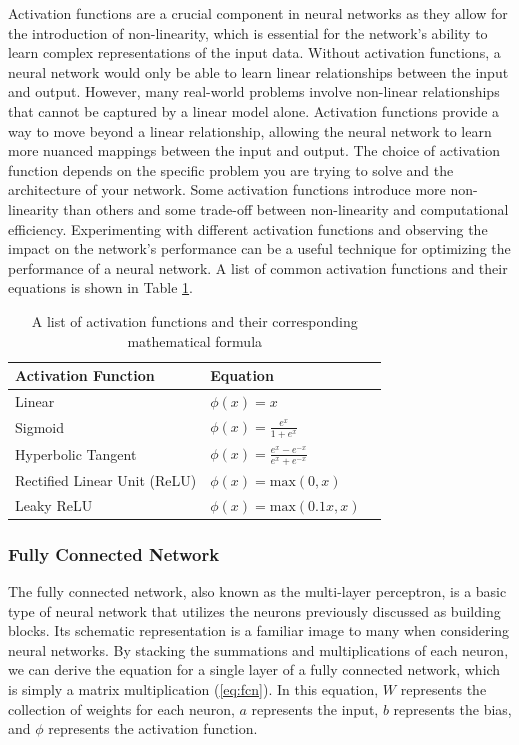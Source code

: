 Activation functions are a crucial component in neural networks as they allow for the introduction of non-linearity, which is essential for the network's ability to learn complex representations of the input data.
Without activation functions, a neural network would only be able to learn linear relationships between the input and output.
However, many real-world problems involve non-linear relationships that cannot be captured by a linear model alone.
Activation functions provide a way to move beyond a linear relationship, allowing the neural network to learn more nuanced mappings between the input and output.
The choice of activation function depends on the specific problem you are trying to solve and the architecture of your network.
Some activation functions introduce more non-linearity than others and some trade-off between non-linearity and computational efficiency.
Experimenting with different activation functions and observing the impact on the network's performance can be a useful technique for optimizing the performance of a neural network.
A list of common activation functions and their equations is shown in Table \ref{tab:activation-functions}.

\begin{table}[H]
    \caption{A list of activation functions and their corresponding mathematical formula} \label{tab:activation-functions}
    \begin{tabularx}{\columnwidth}{|X|X|X|}
        \hline
        {\bf Activation Function} & {\bf Equation} \\ \hline 
        Linear & $\phi(x) = x$ \\\hline
        Sigmoid & $\phi(x) = \frac{e^{x}}{1 + e^{x}}$\\ \hline 
        Hyperbolic Tangent & $\phi(x) = \frac{e^x - e^{-x}}{e^{x} + e^{-x}}$\\ \hline 
        Rectified Linear Unit (ReLU) & $\phi(x) = \text{max}(0,x)$\\ \hline 
        Leaky ReLU & $\phi(x) = \text{max}(0.1x,x)$ \\ \hline 
    \end{tabularx}
\end{table}

\subsubsection{Fully Connected Network}
The fully connected network, also known as the multi-layer perceptron, is a basic type of neural network that utilizes the neurons previously discussed as building blocks.
Its schematic representation is a familiar image to many when considering neural networks.
By stacking the summations and multiplications of each neuron, we can derive the equation for a single layer of a fully connected network, which is simply a matrix multiplication (\cref{eq:fcn}).
In this equation, $W$ represents the collection of weights for each neuron, $a$ represents the input, $b$ represents the bias, and $\phi$ represents the activation function.

